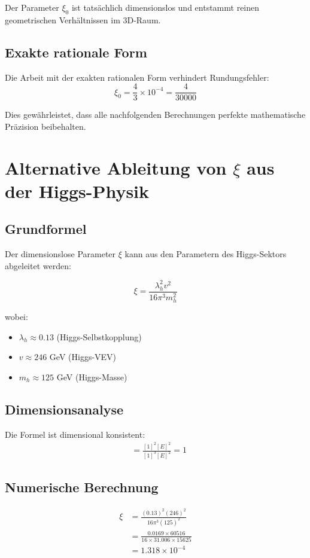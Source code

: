 \documentclass[12pt,a4paper]{article}
\theoremstyle{definition}
\begin{document}
	Der Parameter $\xi_0$ ist tatsächlich dimensionslos und entstammt reinen geometrischen Verhältnissen im 3D-Raum.
	
	\subsection{Exakte rationale Form}
	
	Die Arbeit mit der exakten rationalen Form verhindert Rundungsfehler:
	\begin{equation}
		\xi_0 = \frac{4}{3} \times 10^{-4} = \frac{4}{30000}
	\end{equation}
	
	Dies gewährleistet, dass alle nachfolgenden Berechnungen perfekte mathematische Präzision beibehalten.
	
	\section{Alternative Ableitung von $\xi$ aus der Higgs-Physik}
	\label{sec:higgs-derive}
	
	\subsection{Grundformel}
	Der dimensionslose Parameter $\xi$ kann aus den Parametern des Higgs-Sektors abgeleitet werden:
	
	\begin{equation}
		\xi = \frac{\lambda_h^2 v^2}{16\pi^3 m_h^2}
	\end{equation}
	
	wobei:
	\begin{itemize}
		\item $\lambda_h \approx 0.13$ (Higgs-Selbstkopplung)
		\item $v \approx 246$ GeV (Higgs-VEV)
		\item $m_h \approx 125$ GeV (Higgs-Masse)
	\end{itemize}
	
	\subsection{Dimensionsanalyse}
	Die Formel ist dimensional konsistent:
	\begin{align*}
		[\xi] &= \frac{[1]^2[E]^2}{[1]^3[E]^2} = 1
	\end{align*}
	
	\subsection{Numerische Berechnung}
	\begin{align*}
		\xi &= \frac{(0.13)^2(246)^2}{16\pi^3(125)^2} \\
		&= \frac{0.0169 \times 60516}{16 \times 31.006 \times 15625} \\
		&= 1.318 \times 10^{-4}
	\end{align*}
	
\end{document}
